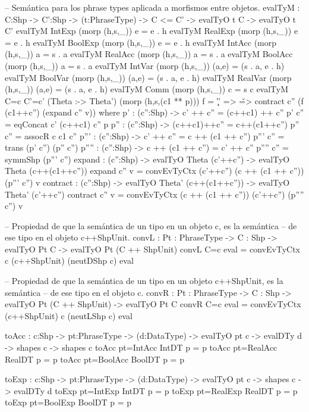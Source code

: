 \begin{code}
-- Semántica para los phrase types aplicada a morfismos entre objetos.
evalTyM : {C:Shp} -> {C':Shp} -> 
          (t:PhraseType) -> C <= C' -> evalTyO t C -> evalTyO t C'
evalTyM IntExp             (morp (h,s,_)) e         = e . h
evalTyM RealExp            (morp (h,s,_)) e         = e . h
evalTyM BoolExp            (morp (h,s,_)) e         = e . h
evalTyM IntAcc             (morp (h,s,_)) a         = s . a
evalTyM RealAcc            (morp (h,s,_)) a         = s . a
evalTyM BoolAcc            (morp (h,s,_)) a         = s . a
evalTyM IntVar             (morp (h,s,_)) (a,e)     = (s . a, e . h)
evalTyM BoolVar            (morp (h,s,_)) (a,e)     = (s . a, e . h)
evalTyM RealVar            (morp (h,s,_)) (a,e)     = (s . a, e . h)
evalTyM Comm               (morp (h,s,_)) c         = s c
evalTyM {C=c} {C'=c'} (Theta :-> Theta') (morp (h,s,(c1 ** p))) f = 
                    \c'' => \v => contract c'' (f (c1++c'') (expand c'' v))
    where
        p' : (c'':Shp) -> c' ++ c'' = (c++c1) ++ c''
        p' c'' = eqConcat c' (c++c1) c'' p
        p'' : (c'':Shp) -> (c++c1)++c'' = c++(c1++c'')
        p'' c'' = assocR c c1 c''
        p''' : (c'':Shp) -> c' ++ c'' = c ++ (c1 ++ c'')
        p''' c'' = trans (p' c'') (p'' c'')
        p'''' : (c'':Shp) -> c ++ (c1 ++ c'') = c' ++ c''
        p'''' c'' = symmShp (p''' c'')
        expand : (c'':Shp) -> evalTyO Theta (c'++c'') -> evalTyO Theta (c++(c1++c''))
        expand c'' v = convEvTyCtx (c'++c'') (c ++ (c1 ++ c'')) (p''' c'') v
        contract : (c'':Shp) -> evalTyO Theta' (c++(c1++c'')) -> evalTyO Theta' (c'++c'')
        contract c'' v = convEvTyCtx (c ++ (c1 ++ c'')) (c'++c'') (p'''' c'') v

-- Propiedad de que la semántica de un tipo en un objeto c, es la semántica
-- de ese tipo en el objeto c++ShpUnit.
convL : {Pt : PhraseType} -> {C : Shp} -> evalTyO Pt C -> evalTyO Pt (C ++ ShpUnit)
convL {C=c} eval = convEvTyCtx c (c++ShpUnit) (neutDShp c) eval

-- Propiedad de que la semántica de un tipo en un objeto c++ShpUnit, es la semántica
-- de ese tipo en el objeto c.
convR : {Pt : PhraseType} -> {C : Shp} -> evalTyO Pt (C ++ ShpUnit) -> evalTyO Pt C
convR {C=c} eval = convEvTyCtx (c++ShpUnit) c (neutLShp c) eval

toAcc : {c:Shp} -> {pt:PhraseType} -> 
        (d:DataType) -> evalTyO pt c -> evalDTy d -> shapes c -> shapes c
toAcc {pt=IntAcc}  IntDT  p = p
toAcc {pt=RealAcc} RealDT p = p
toAcc {pt=BoolAcc} BoolDT p = p

toExp : {c:Shp} -> {pt:PhraseType} -> 
        (d:DataType) -> evalTyO pt c -> shapes c -> evalDTy d
toExp {pt=IntExp}  IntDT  p = p
toExp {pt=RealExp} RealDT p = p
toExp {pt=BoolExp} BoolDT p = p


\end{code}

